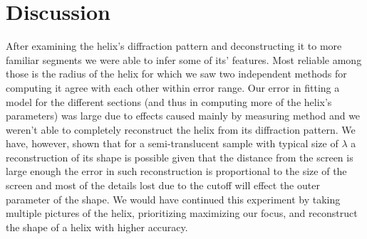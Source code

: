 \section{Discussion}
After examining the helix's diffraction pattern and deconstructing it to more familiar segments we were able to infer some of its' features.
Most reliable among those is the radius of the helix for which we saw two independent methods for computing it agree with each other within error range.
Our error in fitting a model for the different sections (and thus in computing more of the helix's parameters) was large due to effects caused mainly by measuring method and we weren't able to completely reconstruct the helix from its diffraction pattern.
We have, however, shown that for a semi-translucent sample with typical size of $\lambda$ a reconstruction of its shape
is possible given that the distance from the screen is large enough the error in such reconstruction is proportional to the
size of the screen and most of the details lost due to the cutoff will effect the outer parameter of the shape.
We  would have continued this experiment by taking multiple pictures of the helix, prioritizing maximizing our focus,
and reconstruct the shape of a helix with higher accuracy.